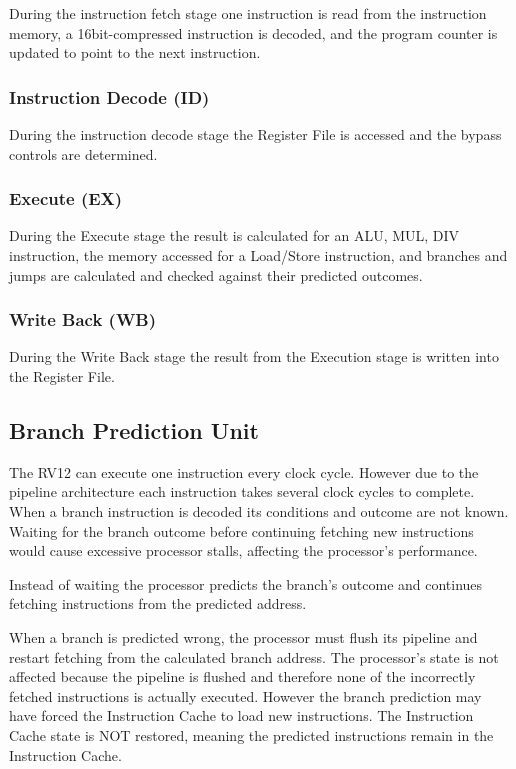 During the instruction fetch stage one instruction is read from the
instruction memory, a 16bit-compressed instruction is decoded, and the
program counter is updated to point to the next instruction.

\subsubsection{Instruction Decode (ID)}\label{instruction-decode-id}

During the instruction decode stage the Register File is accessed and
the bypass controls are determined.

\subsubsection{Execute (EX)}\label{execute-ex}

During the Execute stage the result is calculated for an
ALU, MUL, DIV instruction, the memory accessed for a Load/Store instruction, and branches and jumps are calculated and checked against their predicted outcomes.

\subsubsection{Write Back (WB)}\label{write-back-wb}

During the Write Back stage the result from the Execution stage is written into the Register
File.

\subsection{Branch Prediction Unit}\label{branch-prediction-unit}

The RV12 can execute one instruction every clock cycle. However due to
the pipeline architecture each instruction takes several clock cycles to
complete. When a branch instruction is decoded its conditions and
outcome are not known. Waiting for the branch outcome before continuing
fetching new instructions would cause excessive processor stalls,
affecting the processor's performance.

Instead of waiting the processor predicts the branch's outcome and
continues fetching instructions from the predicted address.

When a branch is predicted wrong, the processor must flush its pipeline
and restart fetching from the calculated branch address. The processor's
state is not affected because the pipeline is flushed and therefore none
of the incorrectly fetched instructions is actually executed. However
the branch prediction may have forced the Instruction Cache to load new
instructions. The Instruction Cache state is NOT restored, meaning the
predicted instructions remain in the Instruction Cache.

